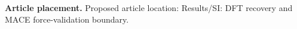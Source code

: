 \textbf{Article placement.} Proposed article location: Results/SI: DFT recovery and MACE force-validation boundary.
